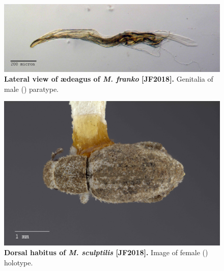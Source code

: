 \documentclass[fleqn,10pt,lineno]{wlpeerj} %
\begin{document}
\begin{figure}[h]
	\centering
	\begin{sideways}
		\includegraphics[width=0.95\textheight]{franko_aedeagus_lateral.jpg}
	\end{sideways}
	\caption{\textbf{Lateral view of {\ae}deagus of \textit{M. franko} [JF2018].} Genitalia of male (\male) paratype.}
	\label{fig:franko_aedeagus_lateral}
\end{figure}

\begin{figure}[h]
	\begin{sideways}
		\centering
		\includegraphics[height=\textwidth]{sculptilis_F_dorsal.jpg}
	\end{sideways}
	\caption{\textbf{Dorsal habitus of \textit{M. sculptilis} [JF2018].} Image of female (\female) holotype.}
	\label{fig:sculptilis_F_dorsal}
\end{figure}
\end{document}
